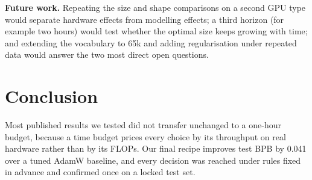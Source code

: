 \documentclass[11pt,a4paper]{article}
\begin{document}
\textbf{Future work.} Repeating the size and shape comparisons on a second GPU type would separate hardware effects from modelling effects; a third horizon (for example two hours) would test whether the optimal size keeps growing with time; and extending the vocabulary to 65k and adding regularisation under repeated data would answer the two most direct open questions.

\section{Conclusion}

Most published results we tested did not transfer unchanged to a one-hour budget, because a time budget prices every choice by its throughput on real hardware rather than by its FLOPs. Our final recipe improves test BPB by 0.041 over a tuned AdamW baseline, and every decision was reached under rules fixed in advance and confirmed once on a locked test set.

\end{document}
